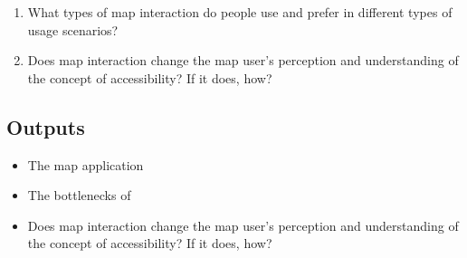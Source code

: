 \begin{enumerate}
	\item What types of map interaction do people use and prefer in different types of usage scenarios?
	\item Does map interaction change the map user's perception and understanding of the concept of accessibility? If it does, how?
\end{enumerate}

\subsection{Outputs}

\begin{itemize}
	\item The map application
	\item The bottlenecks of 
	\item Does map interaction change the map user's perception and understanding of the concept of accessibility? If it does, how?
\end{itemize}




